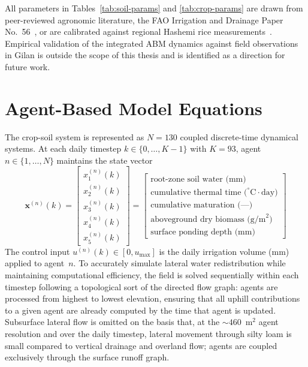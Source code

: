 All parameters in Tables~\ref{tab:soil-params} and \ref{tab:crop-params}
are drawn from peer-reviewed agronomic literature, the FAO Irrigation
and Drainage Paper No.~56~\cite{allen1998}, or are calibrated against
regional Hashemi rice measurements~\cite{sadidi2021,jalali2021}.
Empirical validation of the integrated ABM dynamics against field
observations in Gilan is outside the scope of this thesis and is
identified as a direction for future work.

\section{Agent-Based Model Equations}
\label{sec:sys-abm}

The crop-soil system is represented as $N = 130$ coupled discrete-time
dynamical systems. At each daily timestep $k \in \{0, \ldots, K-1\}$
with $K = 93$, agent $n \in \{1, \ldots, N\}$ maintains the state
vector
\begin{equation}
\mathbf{x}^{(n)}(k) = \begin{bmatrix}
x_1^{(n)}(k) \\
x_2^{(n)}(k) \\
x_3^{(n)}(k) \\
x_4^{(n)}(k) \\
x_5^{(n)}(k)
\end{bmatrix}
=
\begin{bmatrix}
\text{root-zone soil water (mm)}\\
\text{cumulative thermal time (}^{\circ}\mathrm{C}\cdot\text{day)}\\
\text{cumulative maturation (---)} \\
\text{aboveground dry biomass (g/m}^2\text{)} \\
\text{surface ponding depth (mm)}
\end{bmatrix}
\label{eq:state-vec}
\end{equation}
The control input $u^{(n)}(k) \in [0, u_{\max}]$ is the daily irrigation
volume (mm) applied to agent~$n$. To accurately simulate lateral water
redistribution while maintaining computational efficiency, the field is
solved sequentially within each timestep following a topological sort
of the directed flow graph: agents are processed from highest to
lowest elevation, ensuring that all uphill contributions to a given
agent are already computed by the time that agent is updated.
Subsurface lateral flow is omitted on the basis that, at the
$\sim$$460$~m$^2$ agent resolution and over the daily timestep, lateral
movement through silty loam is small compared to vertical drainage and
overland flow; agents are coupled exclusively through the surface
runoff graph.

